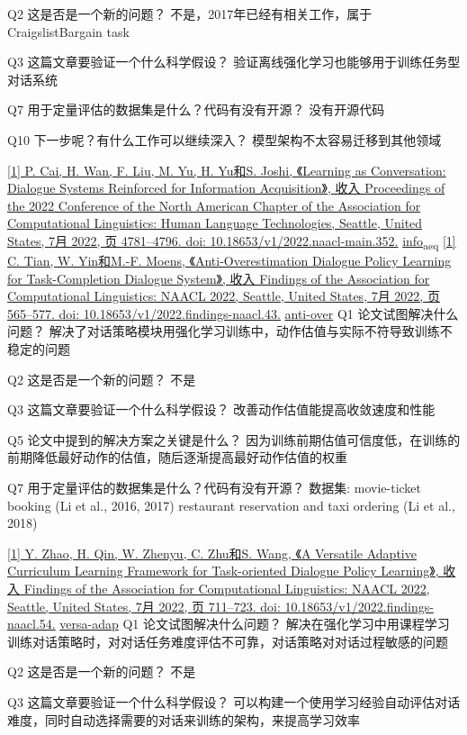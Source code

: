 \documentclass[11pt]{article}
\begin{document}
Q2 这是否是一个新的问题？
不是，2017年已经有相关工作，属于 CraigslistBargain task

Q3 这篇文章要验证一个什么科学假设？
验证离线强化学习也能够用于训练任务型对话系统

Q7 用于定量评估的数据集是什么？代码有没有开源？
没有开源代码

Q10 下一步呢？有什么工作可以继续深入？
模型架构不太容易迁移到其他领域

\href{//select/items/1\_3466QBVQ}{[1] P. Cai, H. Wan, F. Liu, M. Yu, H. Yu和S. Joshi, 《Learning as Conversation: Dialogue Systems Reinforced for Information Acquisition》, 收入 Proceedings of the 2022 Conference of the North American Chapter of the Association for Computational Linguistics: Human Language Technologies, Seattle, United States, 7月 2022, 页 4781–4796. doi: 10.18653/v1/2022.naacl-main.352.} \href{20221020132554.org}{info\textsubscript{acq}}
\href{//select/items/1\_IGZX58HZ}{[1] C. Tian, W. Yin和M.-F. Moens, 《Anti-Overestimation Dialogue Policy Learning for Task-Completion Dialogue System》, 收入 Findings of the Association for Computational Linguistics: NAACL 2022, Seattle, United States, 7月 2022, 页 565–577. doi: 10.18653/v1/2022.findings-naacl.43.} \href{20221020133831.org}{anti-over}
  Q1 论文试图解决什么问题？
解决了对话策略模块用强化学习训练中，动作估值与实际不符导致训练不稳定的问题

Q2 这是否是一个新的问题？
不是

Q3 这篇文章要验证一个什么科学假设？
改善动作估值能提高收敛速度和性能

Q5 论文中提到的解决方案之关键是什么？
因为训练前期估值可信度低，在训练的前期降低最好动作的估值，随后逐渐提高最好动作估值的权重

Q7 用于定量评估的数据集是什么？代码有没有开源？
数据集:
movie-ticket booking (Li et al., 2016, 2017)
 restaurant reservation and taxi ordering (Li et al., 2018)

\href{//select/items/1\_4S782Q6M}{[1] Y. Zhao, H. Qin, W. Zhenyu, C. Zhu和S. Wang, 《A Versatile Adaptive Curriculum Learning Framework for Task-oriented Dialogue Policy Learning》, 收入 Findings of the Association for Computational Linguistics: NAACL 2022, Seattle, United States, 7月 2022, 页 711–723. doi: 10.18653/v1/2022.findings-naacl.54.} \href{20221020135523.org}{versa-adap}
  Q1 论文试图解决什么问题？
解决在强化学习中用课程学习训练对话策略时，对对话任务难度评估不可靠，对话策略对对话过程敏感的问题

Q2 这是否是一个新的问题？
不是

Q3 这篇文章要验证一个什么科学假设？
可以构建一个使用学习经验自动评估对话难度，同时自动选择需要的对话来训练的架构，来提高学习效率
\end{document}
